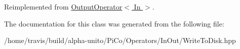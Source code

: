 \-Reimplemented from \hyperlink{class_output_operator_aa0d416361680f33ebd6e1785a97bc3fe}{\-Output\-Operator$<$ In $>$}.



\-The documentation for this class was generated from the following file\-:\begin{DoxyCompactItemize}
\item 
/home/travis/build/alpha-\/unito/\-Pi\-Co/\-Operators/\-In\-Out/\-Write\-To\-Disk.\-hpp\end{DoxyCompactItemize}
